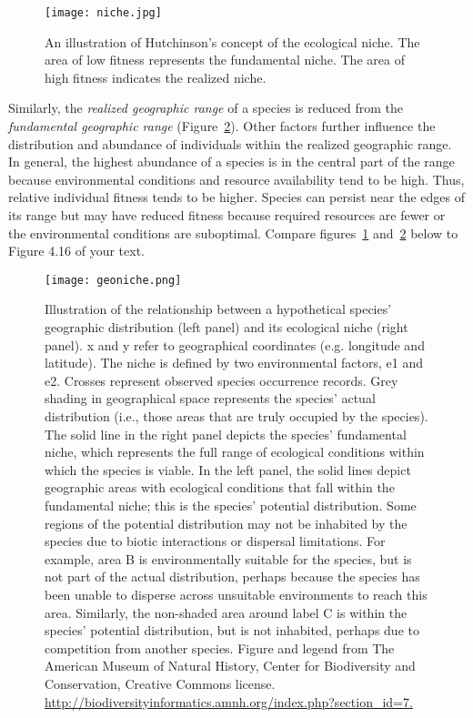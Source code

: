 \documentclass[11pt, hidelinks]{article}
\begin{document}
\begin{figure}[htb]
	\centering
	\texttt{[image: niche.jpg]}
	\caption{An illustration of Hutchinson's concept of the ecological niche. The area of low fitness represents the fundamental niche. The area of high fitness indicates the realized niche. \label{hutch niche}}
\end{figure}

Similarly, the \emph{realized geographic range} of a species is reduced from the \emph{fundamental geographic range} (Figure~\ref{geoniche}). Other factors further influence the distribution and abundance of individuals within the realized geographic range. In general, the highest abundance of a species is in the central part of the range because environmental conditions and resource availability tend to be high. Thus, relative individual fitness tends to be higher.  Species can persist near the edges of its range but may have reduced fitness because required resources are fewer or the environmental conditions are suboptimal.  Compare figures~\ref{hutch niche} and~\ref{geoniche} below to Figure 4.16 of your text.  

\begin{figure}
	\centering
	\texttt{[image: geoniche.png]}
	\caption{Illustration of the relationship between a hypothetical species' geographic distribution (left panel) and its ecological niche (right panel).  x and y refer to geographical coordinates (e.g. longitude and latitude). The niche is defined by two environmental factors, e1 and e2. Crosses represent observed species occurrence records. Grey shading in geographical space represents the species' actual distribution (i.e., those areas that are truly occupied by the species). The solid line in the right panel depicts the species' fundamental niche, which represents the full range of ecological conditions within which the species is viable. In the left panel, the solid lines depict geographic areas with ecological conditions that fall within the fundamental niche; this is the species' potential distribution. Some regions of the potential distribution may not be inhabited by the species due to biotic interactions or dispersal limitations. For example, area B is environmentally suitable for the species, but is not part of the actual distribution, perhaps because the species has been unable to disperse across unsuitable environments to reach this area. Similarly, the non-shaded area around label C is within the species' potential distribution, but is not inhabited, perhaps due to competition from another species. Figure and legend from The American Museum of Natural History, Center for Biodiversity and Conservation, Creative Commons license. \url{http://biodiversityinformatics.amnh.org/index.php?section_id=7.}\label{geoniche}}
\end{figure}
\end{document}
